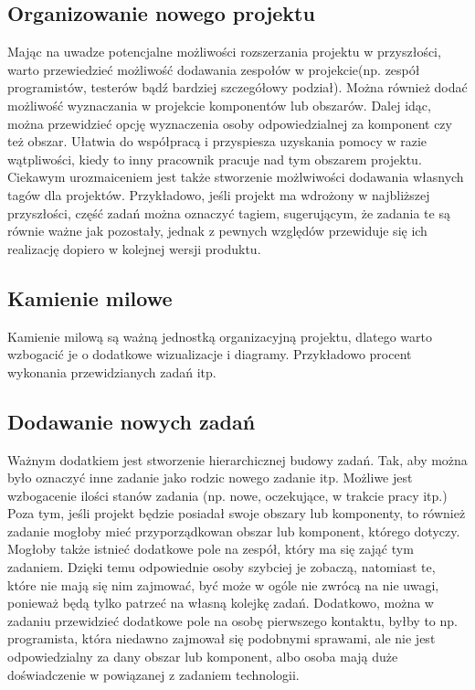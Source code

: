 \documentclass[a4paper,12pt,notitlepage]{mwrep}
\begin{document}
\subsection{Organizowanie nowego projektu}
Mając na uwadze potencjalne możliwości rozszerzania projektu w przyszłości,
warto przewiedzieć możliwość dodawania zespołów w projekcie(np. zespół programistów,
testerów bądź bardziej szczegółowy podział). Można również dodać możliwość wyznaczania
w projekcie komponentów lub obszarów. Dalej idąc, można przewidzieć opcję wyznaczenia osoby
odpowiedzialnej za komponent czy też obszar. Ułatwia do współpracą i przyspiesza uzyskania
pomocy w razie wątpliwości, kiedy to inny pracownik pracuje nad tym obszarem projektu.
Ciekawym urozmaiceniem jest także stworzenie możlwiwości dodawania własnych tagów dla projektów.
Przykładowo, jeśli projekt ma wdrożony w najbliższej przyszłości, część zadań można oznaczyć tagiem,
sugerującym, że zadania te są równie ważne jak pozostały, jednak z pewnych względów przewiduje się ich
realizację dopiero w kolejnej wersji produktu.


\subsection{Kamienie milowe}
Kamienie milową są ważną jednostką organizacyjną projektu, dlatego warto wzbogacić je o dodatkowe
wizualizacje i diagramy. Przykładowo procent wykonania przewidzianych zadań itp.


\subsection{Dodawanie nowych zadań}
Ważnym dodatkiem jest stworzenie hierarchicznej budowy zadań.
Tak, aby można było oznaczyć inne zadanie jako rodzic nowego zadanie itp. Możliwe jest
wzbogacenie ilości stanów zadania (np. nowe, oczekujące, w trakcie pracy itp.) Poza tym,
jeśli projekt będzie posiadał swoje obszary lub komponenty, to również zadanie mogłoby mieć
przyporządkowan obszar lub komponent, którego dotyczy. Mogłoby także istnieć dodatkowe pole
na zespół, który ma się zająć tym zadaniem. Dzięki temu odpowiednie osoby szybciej je zobaczą,
natomiast te, które nie mają się nim zajmować, być może w ogóle nie zwrócą na nie uwagi,
ponieważ będą tylko patrzeć na własną kolejkę zadań. Dodatkowo, można w zadaniu przewidzieć
dodatkowe pole na osobę pierwszego kontaktu, byłby to np. programista, która niedawno zajmował
się podobnymi sprawami, ale nie jest odpowiedzialny za dany obszar lub komponent, albo osoba mają
duże doświadczenie w powiązanej z zadaniem technologii.
\end{document}
